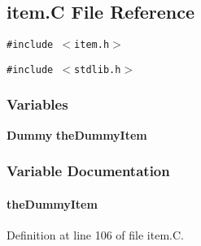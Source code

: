 \subsection{item.C File Reference}
\label{item.C}
{\tt \#include $<$item.h$>$}\par
{\tt \#include $<$stdlib.h$>$}\par
\subsubsection*{Variables}
\begin{CompactItemize}
\item 
{\bf Dummy} {\bf the\-Dummy\-Item}
\end{CompactItemize}


\subsubsection{Variable Documentation}
\label{item.C_a0}
\paragraph{ the\-Dummy\-Item}\hfill



Definition at line 106 of file item.C.